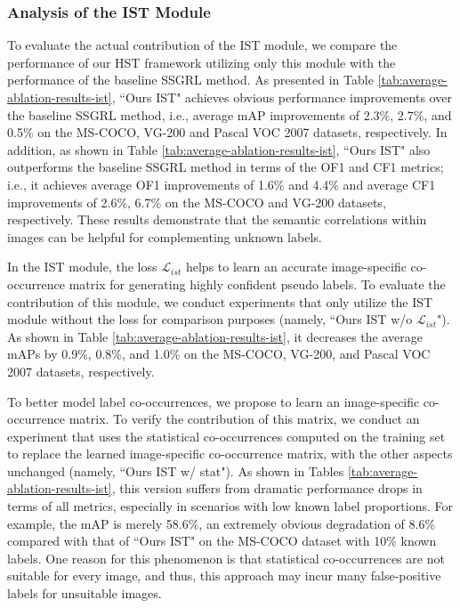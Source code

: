 \subsubsection{Analysis of the IST Module}
To evaluate the actual contribution of the IST module, we compare the performance of our HST framework utilizing only this module with the performance of the baseline SSGRL method. As presented in Table \ref{tab:average-ablation-results-ist}, ``Ours IST" achieves obvious performance improvements over the baseline SSGRL method, i.e., average mAP improvements of 2.3\%, 2.7\%, and 0.5\% on the MS-COCO, VG-200 and Pascal VOC 2007 datasets, respectively. In addition, as shown in Table \ref{tab:average-ablation-results-ist}, ``Ours IST" also outperforms the baseline SSGRL method in terms of the OF1 and CF1 metrics; i.e., it achieves average OF1 improvements of 1.6\% and 4.4\% and average CF1 improvements of 2.6\%, 6.7\% on the MS-COCO and VG-200 datasets, respectively. These results demonstrate that the semantic correlations within images can be helpful for complementing unknown labels.


In the IST module, the loss $\mathcal{L}_{ist}$ helps to learn an accurate image-specific co-occurrence matrix for generating highly confident pseudo labels. To evaluate the contribution of this module, we conduct experiments that only utilize the IST module without the loss for comparison purposes (namely, ``Ours IST w/o $\mathcal{L}_{ist}$"). As shown in Table \ref{tab:average-ablation-results-ist}, it decreases the average mAPs by 0.9\%, 0.8\%, and 1.0\% on the MS-COCO, VG-200, and Pascal VOC 2007 datasets, respectively.

To better model label co-occurrences, we propose to learn an image-specific co-occurrence matrix. To verify the contribution of this matrix, we conduct an experiment that uses the statistical co-occurrences computed on the training set to replace the learned image-specific co-occurrence matrix, with the other aspects unchanged (namely, ``Ours IST w/ stat"). As shown in Tables \ref{tab:average-ablation-results-ist}, this version suffers from dramatic performance drops in terms of all metrics, especially in scenarios with low known label proportions. For example, the mAP is merely 58.6\%, an extremely obvious degradation of 8.6\% compared with that of ``Ours IST" on the MS-COCO dataset with 10\% known labels. One reason for this phenomenon is that statistical co-occurrences are not suitable for every image, and thus, this approach may incur many false-positive labels for unsuitable images.


